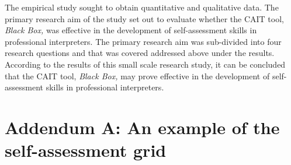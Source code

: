 \documentclass[output=paper]{langsci/langscibook}
\begin{document}
The empirical study sought to obtain quantitative and qualitative data. The primary research aim of the study set out to evaluate whether the CAIT tool, \textit{Black Box,} was effective in the development of self-assessment skills in professional interpreters. The primary research aim was sub-divided into four research questions and that was covered addressed above under the results. According to the results of this small scale research study, it can be concluded that the CAIT tool, \textit{Black Box,} may prove effective in the development of self-assessment skills in professional interpreters. 


\section*{Addendum A: An example of the self-assessment grid}
\end{document}
